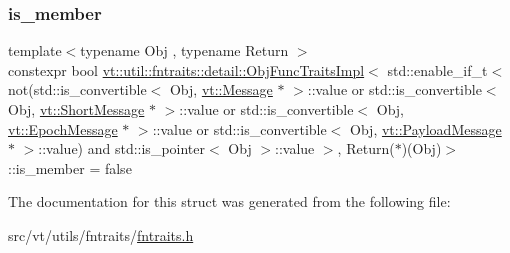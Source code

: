 \subsubsection{\texorpdfstring{is\+\_\+member}{is\_member}}
{\footnotesize\ttfamily template$<$typename Obj , typename Return $>$ \\
constexpr bool \hyperlink{structvt_1_1util_1_1fntraits_1_1detail_1_1_obj_func_traits_impl}{vt\+::util\+::fntraits\+::detail\+::\+Obj\+Func\+Traits\+Impl}$<$ std\+::enable\+\_\+if\+\_\+t$<$ not(std\+::is\+\_\+convertible$<$ Obj, \hyperlink{namespacevt_a3a3ddfef40b4c90915fa43cdd5f129ea}{vt\+::\+Message} $\ast$ $>$\+::value or std\+::is\+\_\+convertible$<$ Obj, \hyperlink{namespacevt_a1125ac1da6c0bbf141e0ea0739d7602d}{vt\+::\+Short\+Message} $\ast$ $>$\+::value or std\+::is\+\_\+convertible$<$ Obj, \hyperlink{namespacevt_ad67368ffae52d7325002586b41bb150e}{vt\+::\+Epoch\+Message} $\ast$ $>$\+::value or std\+::is\+\_\+convertible$<$ Obj, \hyperlink{namespacevt_a89a92229c5622b855c02c549f83a1a68}{vt\+::\+Payload\+Message} $\ast$ $>$\+::value) and std\+::is\+\_\+pointer$<$ Obj $>$\+::value $>$, Return($\ast$)(Obj)$>$\+::is\+\_\+member = false\hspace{0.3cm}{\ttfamily [static]}}



The documentation for this struct was generated from the following file\+:\begin{DoxyCompactItemize}
\item 
src/vt/utils/fntraits/\hyperlink{fntraits_8h}{fntraits.\+h}\end{DoxyCompactItemize}
